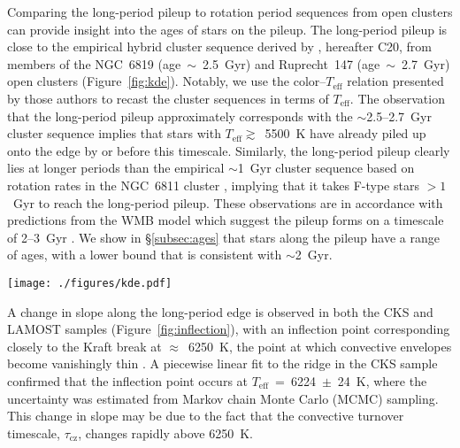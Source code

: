 \documentclass[trackchanges,twocolumn]{aastex631}
\newcommand{\taucz}{$\tau_\mathrm{cz}$\xspace}
\newcommand{\lamostmcq}{LAMOST--McQuillan\xspace}
\newcommand{\teffmin}{5500~K\xspace}
\newcommand{\hall}{H21\xspace}
\newcommand{\curtis}{C20\xspace}
\newcommand{\teff}{\ensuremath{T_{\mathrm{eff}}}\xspace}
\newcommand{\prot}{\ensuremath{P_\mathrm{rot}}\xspace}
\begin{document}
Comparing the long-period pileup to rotation period sequences from open clusters can provide insight into the ages of stars on the pileup. The long-period pileup is close to the empirical hybrid cluster sequence derived by \citet{Curtis2020}, hereafter \curtis, from members of the NGC~6819 (age~$\sim$~2.5~Gyr) and Ruprecht~147 (age~$\sim$~2.7~Gyr) open clusters (Figure~\ref{fig:kde}). Notably, we use the color--\teff relation presented by those authors to recast the cluster sequences in terms of \teff.  The observation that the long-period pileup approximately corresponds with the $\sim$2.5--2.7~Gyr cluster sequence implies that stars with \teff$\gtrsim$~\teffmin have already piled up onto the edge by or before this timescale. Similarly, the long-period pileup clearly lies at longer periods than the empirical $\sim$1~Gyr cluster sequence based on rotation rates in the NGC~6811 cluster \citep{Curtis2019a, Curtis2020}, implying that it takes F-type stars $>1$~Gyr to reach the long-period pileup. These observations are in accordance with predictions from the WMB model which suggest the pileup forms on a timescale of 2--3~Gyr \citep{vanSaders2019}. We show in \S\ref{subsec:ages} that stars along the pileup have a range of ages, with a lower bound that is consistent with $\sim$2~Gyr.

\begin{figure*}
    \centering
    \texttt{[image: ./figures/kde.pdf]}
    \caption{Gaussian kernel density estimation (blue contours) of the \teff--\prot distributions of the CKS--McQuillan, \lamostmcq, and asteroseismic \hall samples, from left to right. Empirical cluster sequences from \curtis are shown by the dark grey lines. The orange dashed lines show constant Rossby curves of fiducial values (see \S\ref{subsec:rossby}). The short-period pileup can be observed in the LAMOST--McQuillan sample for \teff~$\gtrsim$~5500~K. The orange point indicates the Sun's temperature and equatorial rotation period, with the errorbar capturing the range of periods measured from the activity belts.}
    \label{fig:kde}
\end{figure*}

A change in slope along the long-period edge is observed in both the CKS and LAMOST samples (Figure~\ref{fig:inflection}), with an inflection point corresponding closely to the Kraft break at $\approx$~6250~K, the point at which convective envelopes become vanishingly thin \citep{Kraft1967}. A piecewise linear fit to the ridge in the CKS sample confirmed that the inflection point occurs at \teff~=~6224~$\pm$~24~K, where the uncertainty was estimated from Markov chain Monte Carlo (MCMC) sampling. This change in slope may be due to the fact that the convective turnover timescale, \taucz, changes rapidly above 6250~K.
\end{document}
